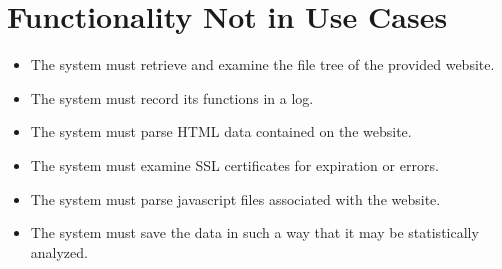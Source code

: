 \section{Functionality Not in Use Cases}
\begin{itemize} 
    \item The system must retrieve and examine the file tree of the provided website.
    \item The system must record its functions in a log.
    \item The system must parse HTML data contained on the website.
    \item The system must examine SSL certificates for expiration or errors.
    \item The system must parse javascript files associated with the website.
    \item The system must save the data in such a way that it may be statistically analyzed.
\end{itemize}
